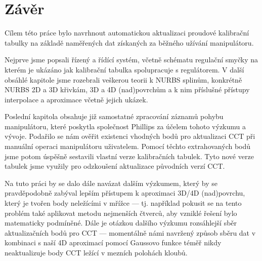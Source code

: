 \section{Závěr}
Cílem této práce bylo navrhnout automatickou aktualizaci proudové kalibrační tabulky na základě naměřených dat získaných za běžného užívání manipulátoru.
\par
Nejprve jsme popsali řízený a řídící systém, včetně schématu regulační smyčky na kterém je ukázáno jak kalibrační tabulka spolupracuje s regulátorem. V další obsáhlé kapitole jsme rozebrali veškerou teorii k NURBS splinům, konkrétně NURBS 2D a 3D křivkám, 3D a 4D (nad)povrchům a k nim příslušné přístupy interpolace a aproximace včetně jejich ukázek.
\par 
Poslední kapitola obsahuje již samostatné zpracování záznamů pohybu manipulátoru, které poskytla společnost Phillips za účelem tohoto výzkumu a vývoje. Podařilo se nám ověřit existenci vhodných bodů pro aktualizaci CCT při manuální operaci manipulátoru uživatelem. Pomocí těchto extrahovaných bodů jsme potom úspěšně sestavili vlastní verze kalibračních tabulek. Tyto nové verze tabulek jsme využily pro odzkoušení aktualizace původních verzí CCT.
\par
{}
Na tuto práci by se dalo dále navázat dalším výzkumem, který by se pravděpodobně zabýval lepším přístupem k aproximaci 3D/4D (nad)povrchu, který je tvořen body neležícími v mřížce --- tj. například pokusit se na tento problém také aplikovat metodu nejmenších čtverců, aby vzniklé řešení bylo matematicky podmíněné. Dále je otázkou dalšího výzkumu rozsáhlejší sběr aktualizačních bodů pro CCT --- momentálně námi navržený způsob sběru dat v kombinaci s naší 4D aproximací pomocí Gaussovo funkce téměř nikdy neaktualizuje body CCT ležící v mezních polohách kloubů.
